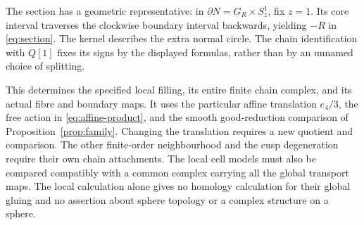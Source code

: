 \documentclass[11pt]{article}
\numberwithin{equation}{section}
\begin{document}
The section has a geometric representative: in
$\partial N=G_R\times S^1_z$, fix $z=1$. Its core interval
traverses the clockwise boundary interval backwards, yielding
$-R$ in \eqref{eq:section}. The kernel describes the extra normal
circle. The chain identification with $Q[1]$ fixes its signs by the
displayed formulas, rather than by an unnamed choice of splitting.

This determines the specified local filling, its entire finite chain
complex, and its actual fibre and boundary maps. It uses the particular affine
translation $e_4/3$, the free action in \eqref{eq:affine-product},
and the smooth good-reduction comparison of
Proposition~\ref{prop:family}. Changing the translation requires a
new quotient and comparison. The other finite-order neighbourhood and
the cusp degeneration require their own chain attachments. The local
cell models must also be compared compatibly with a common complex
carrying all the global transport maps. The local
calculation alone gives no homology calculation for their global gluing
and no assertion about sphere topology or a complex structure on a sphere.


\end{document}
